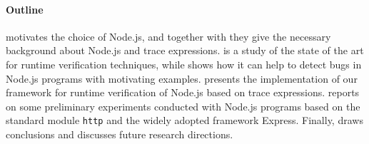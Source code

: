 \paragraph{Outline}
 motivates the choice of Node.js, and together with  they give the necessary background about Node.js and trace expressions.
 is a study of the state of the art for runtime verification techniques, while  shows how it can help to detect bugs in Node.js programs with motivating examples.
 presents the implementation of our framework for runtime verification of Node.js based on trace expressions.
 reports on some preliminary experiments conducted with Node.js programs based on the standard module
\lstinline{http} and the widely adopted framework Express.
Finally,  draws conclusions and discusses future research directions.
